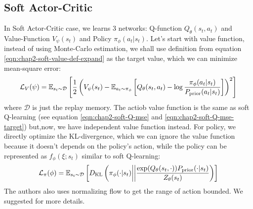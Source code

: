 \subsection{Soft Actor-Critic}
\label{sec:chap2-soft-ac-implement}

In Soft Actor-Critic case, we learns 3 networks: Q-function $Q_{\theta} (s_t, a_t)$ and Value-Function $V_{\psi}(s_t)$ and Policy $\pi_{\phi}(a_t | s_t)$. Let's start with value function, instead of using Monte-Carlo estimation, we shall use definition from equation \ref{eqn:chap2-soft-value-def-expand} as the target value, which we can minimize mean-square error:
\begin{equation}
    \mathcal{L}_V(\psi) = \mathbb{E}_{s_t \sim \mathcal{D}} \left[ \frac{1}{2} \left( V_{\psi}(s_t) - \mathbb{E}_{a_t \sim \pi_{\phi}}\left[ Q_{\theta}(s_t, a_t) - \log \frac{\pi_{\phi}(a_t | s_t)}{P_{\text{prior}}(a_t | s_t)} \right] \right)^2 \right]
\end{equation}
where $\mathcal{D}$ is just the replay memory. The actiob value function is the same as soft Q-learning (see equation \ref{eqn:chap2-soft-Q-mse} and \ref{eqn:chap2-soft-Q-mse-target}) but,now, we have independent value function instead. For policy, we directly optimize the KL-divergence, which we can ignore the value function because it doesn't depends on the policy's action, while the policy can be represented as $f_\phi(\xi ; s_t)$ similar to soft Q-learning:
\begin{equation}
    \mathcal{L}_{\pi}(\phi) = \mathbb{E}_{s_t \sim \mathcal{D}} \left[ D_{\mathrm{KL}}\left( \pi_{\phi}(\cdot | s_t) \bigg| \bigg| \frac{\exp(Q_{\theta}(s_t, \cdot)) P_{\text{prior}}(\cdot | s_t)}{Z_{\theta}(s_t)} \right) \right]
\end{equation}
The authors also uses normalizing flow to get the range of action bounded. We suggested \cite{haarnoja2018softa} for more details.